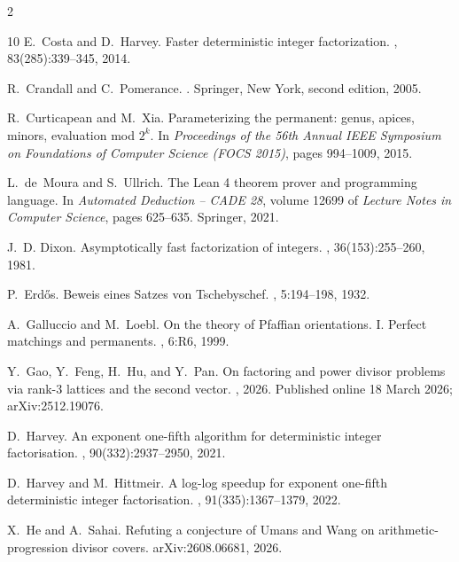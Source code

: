\documentclass[11pt]{article}
\begin{document}
\begin{multicols}{2}
\begin{thebibliography}{10}
E.~Costa and D.~Harvey.
\newblock Faster deterministic integer factorization.
, 83(285):339--345, 2014.

R.~Crandall and C.~Pomerance.
.
\newblock Springer, New York, second edition, 2005.

R.~Curticapean and M.~Xia.
\newblock Parameterizing the permanent: genus, apices, minors, evaluation mod
  $2^k$.
\newblock In {\em Proceedings of the 56th Annual IEEE Symposium on Foundations
  of Computer Science (FOCS 2015)}, pages 994--1009, 2015.

L.~de~Moura and S.~Ullrich.
\newblock The {L}ean 4 theorem prover and programming language.
\newblock In {\em Automated Deduction -- CADE 28}, volume 12699 of {\em Lecture
  Notes in Computer Science}, pages 625--635. Springer, 2021.

J.~D. Dixon.
\newblock Asymptotically fast factorization of integers.
, 36(153):255--260, 1981.

P.~Erd{\H{o}}s.
\newblock Beweis eines {S}atzes von {T}schebyschef.
,
  5:194--198, 1932.

A.~Galluccio and M.~Loebl.
\newblock On the theory of {P}faffian orientations. {I}. {P}erfect matchings
  and permanents.
, 6:R6, 1999.

Y.~Gao, Y.~Feng, H.~Hu, and Y.~Pan.
\newblock On factoring and power divisor problems via rank-3 lattices and the
  second vector.
, 2026.
\newblock Published online 18 March 2026; arXiv:2512.19076.

D.~Harvey.
\newblock An exponent one-fifth algorithm for deterministic integer
  factorisation.
, 90(332):2937--2950, 2021.

D.~Harvey and M.~Hittmeir.
\newblock A log-log speedup for exponent one-fifth deterministic integer
  factorisation.
, 91(335):1367--1379, 2022.

X.~He and A.~Sahai.
\newblock Refuting a conjecture of {U}mans and {W}ang on arithmetic-progression
  divisor covers.
\newblock arXiv:2608.06681, 2026.


\end{thebibliography}
\end{multicols}
\end{document}
